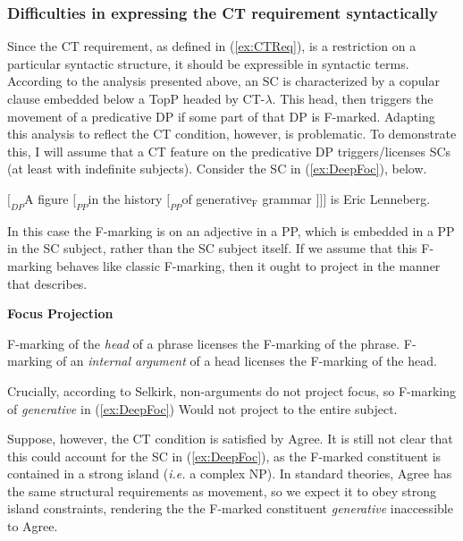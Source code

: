 \documentclass[
]{RCL}
\begin{document}
\subsubsection{Difficulties in expressing the CT requirement syntactically}
Since the CT requirement, as defined in (\ref{ex:CTReq}), is a restriction on a particular syntactic structure, it should be expressible in syntactic terms.
According to the analysis presented above, an SC is characterized by a copular clause embedded below a TopP headed by CT-$\lambda$.
This head, then triggers the movement of a predicative DP if some part of that DP is F-marked.
Adapting this analysis to reflect the CT condition, however, is problematic.
To demonstrate this, I will assume that a CT feature on the predicative DP triggers/licenses SCs (at least with indefinite subjects).
Consider the SC in (\ref{ex:DeepFoc}), below.
\begin{exe}
	\ex\label{ex:DeepFoc} $[_{DP}$A figure $[_{PP}$in the history $[_{PP}$of generative$_\text{F}$ grammar $]]]$ is Eric Lenneberg.
\end{exe}

In this case the F-marking is on an adjective in a PP, which is embedded in a PP in the SC subject, rather than the SC subject itself.
If we assume that this F-marking behaves like classic F-marking, then it ought to project in the manner that \citet{selkirk1996sentence} describes.
\begin{exe}
	\ex \textbf{Focus Projection} \citep{selkirk1996sentence}
	\begin{xlist}
		\ex F-marking of the \textit{head} of a phrase licenses the F-marking of the phrase.
		\ex F-marking of an \textit{internal argument} of a head licenses the F-marking of the head.		
	\end{xlist}	
\end{exe}

Crucially, according to Selkirk, non-arguments do not project focus, so F-marking of \textit{generative} in (\ref{ex:DeepFoc}) Would not project to the entire subject.

Suppose, however, the CT condition is satisfied by Agree.
It is still not clear that this could account for the SC in (\ref{ex:DeepFoc}), as the F-marked constituent is contained in a strong island (\textit{i.e.} a complex NP).
In standard theories, Agree has the same structural requirements as movement, so we expect it to obey strong island constraints, rendering the the F-marked constituent \textit{generative} inaccessible to Agree.
\end{document}
